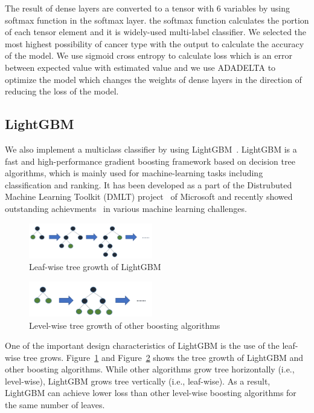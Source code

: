 The result of dense layers are converted to a tensor with 6 variables by using softmax function in the softmax layer. the softmax function calculates the portion of each tensor element and it is widely-used multi-label classifier. We selected the most highest possibility of cancer type with the output to calculate the accuracy of the model. We use sigmoid cross entropy to calculate loss which is an error between expected value with estimated value and we use ADADELTA \cite{zeiler2012adadelta} to optimize the model which changes the weights of dense layers in the direction of reducing the loss of the model.

\subsection{LightGBM}

We also implement a multiclass classifier by using LightGBM~\cite{ke2017lightgbm,meng2016communication}. LightGBM is a fast and high-performance gradient boosting framework based on decision tree algorithms, which is mainly used for machine-learning tasks including classification and ranking. It has been developed as a part of the Distrubuted Machine Learning Toolkit (DMLT) project~\cite{dmtk_project} of Microsoft and recently showed outstanding achievments~\cite{lightgbm_examples} in various machine learning challenges.


\begin{figure}[t]
\includegraphics[width=0.48\textwidth]{figs/leaf-wise_tree_growth.png}
\caption{Leaf-wise tree growth of LightGBM~\cite{lightgbm_guide}}
\label{fig:leaf-wise_tree_growth}
\end{figure}

\begin{figure}[t]
\includegraphics[width=0.48\textwidth]{figs/level-wise_tree_growth.png}
\caption{Level-wise tree growth of other boosting algorithms~\cite{lightgbm_guide}}
\label{fig:level-wise_tree_growth}
\end{figure}

One of the important design characteristics of LightGBM is the use of the leaf-wise tree grows. Figure~\ref{fig:leaf-wise_tree_growth} and Figure~\ref{fig:level-wise_tree_growth} shows the tree growth of LightGBM and other boosting algorithms. While other algorithms grow tree horizontally (i.e., level-wise), LightGBM grows tree vertically (i.e., leaf-wise). As a result, LightGBM can achieve lower loss than other level-wise boosting algorithms for the same number of leaves.

